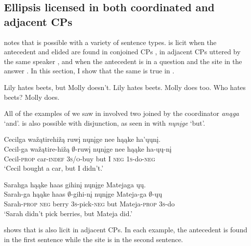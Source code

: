 \documentclass[output=paper]{LSP/langsci}
\begin{document}
\subsection{Ellipsis licensed in both coordinated and adjacent CPs}\label{sec:johnson:3.1}

\citet{Goldberg2005} notes that   is possible with a variety of sentence types.  is licit when the antecedent  and elided  are found in conjoined CPs , in adjacent CPs uttered by the same speaker , and when the antecedent is in a question and the  site in the answer . In this section, I show that the same is true in .
 
\ea\label{ex:johnson:25}
\ea\label{ex:johnson:25a}
Lily hates beets, but Molly doesn't.
\ex\label{ex:johnson:25b}
Lily hates beets. Molly does too.
\ex\label{ex:johnson:25c} 
Who hates beets? Molly does.
\z
\z

All of the examples of  we saw in  involved two  joined by the coordinator \emph{anąga} `and'.  is also possible with disjunction, as seen in  with \emph{nųnįge} `but'.
 
\ea\label{ex:johnson:26}
\ea 
\glll Cecilga wažątirehižą ruwį nųnįge nee hąąke ha'ųųnį.\\
Cecil-ga wažątire-hižą $\emptyset$-ruwį nųnįge nee hąąke ha-ųų-nį\\
Cecil-\textsc{prop} car-\textsc{indef} \textsc{3s/o}-buy but I \textsc{neg} \textsc{1s}-do-\textsc{neg}\\
\trans `Cecil bought a car, but I didn't.'

\ex 
\glll Sarahga hąąke haas gihinį nųnįge Matejaga ųų.\\
Sarah-ga hąąke haas $\emptyset$-gihi-nį nųnįge Mateja-ga $\emptyset$-ųų\\
Sarah-\textsc{prop} \textsc{neg} berry \textsc{3s}-pick-\textsc{neg} but Mateja-\textsc{prop} \textsc{3s}-do\\
\trans `Sarah didn't pick berries, but Mateja did.'
\z
\z


 shows that  is also licit in adjacent CPs. In each example, the antecedent  is found in the first sentence while the  site is in the second sentence.
 
\end{document}
